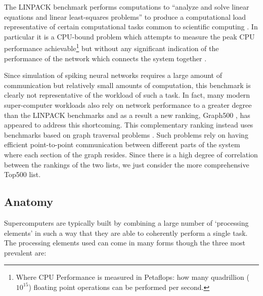 		The LINPACK benchmark performs computations to ``analyze and solve linear
		equations and linear least-squares problems'' to produce a computational
		load representative of certain computational tasks common to scientific
		computing \cite{dongarra84}. In particular it is a CPU-bound problem which
		attempts to measure the peak CPU performance achievable\footnote{Where CPU
		Performance is measured in Petaflops: how many quadrillion ($10^{15}$)
		floating point operations can be performed per second.} but without any
		significant indication of the performance of the network which connects the
		system together \cite{dongarra07}.
		
		Since simulation of spiking neural networks requires a large amount of
		communication but relatively small amounts of computation, this benchmark is
		clearly not representative of the workload of such a task.  In fact, many
		modern super-computer workloads also rely on network performance to a
		greater degree than the LINPACK benchmarks and as a result a new ranking,
		Graph500 \cite{murphy13n}, has appeared to address this shortcoming. This
		complementary ranking instead uses benchmarks based on graph traversal
		problems \cite{murphy10}. Such problems rely on having efficient
		point-to-point communication between different parts of the system where
		each section of the graph resides. Since there is a high degree of
		correlation between the rankings of the two lists, we just consider the more
		comprehensive Top500 list.
		
		
		\subsection{Anatomy}
			
			
			Supercomputers are typically built by combining a large number of
			`processing elements' in such a way that they are able to coherently
			perform a single task. The processing elements used can come in many forms
			though the three most prevalent are:
			
